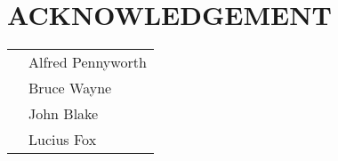 \section*{\centering ACKNOWLEDGEMENT}

\lipsum[2-4]

\begin{tabular}{ p{11cm} p{6cm} } 
                                    &  Alfred Pennyworth \\ 
                                    &  Bruce Wayne \\
                                    &  John Blake \\
                                    &  Lucius Fox \\
\end{tabular}
\newpage